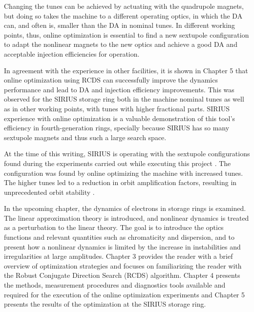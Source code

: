 Changing the tunes can be achieved by actuating with the quadrupole magnets, but doing so takes the machine to a different operating optics, in which the DA can, and often is, smaller than the DA in nominal tunes. In different working points, thus, online optimization is essential to find a new sextupole configuration to adapt the nonlinear magnets to the new optics and achieve a good DA and acceptable injection efficiencies for operation.

In agreement with the experience in other facilities, it is shown in Chapter 5 that online optimization using RCDS can successfully improve the dynamics performance and lead to DA and injection efficiency improvements. This was observed for the SIRIUS storage ring both in the machine nominal tunes as well as in other working points, with tunes with higher fractional parts.  SIRIUS experience with online optimization is a valuable demonstration of this tool's efficiency in fourth-generation rings, specially because SIRIUS has so many sextupole magnets and thus such a large search space.

At the time of this writing, SIRIUS is operating with the sextupole configurations found during the experiments carried out while executing this project \cite{velloso_online_2023}. The configuration was found by online optimizing the machine with increased tunes. The higher tunes led to a reduction in orbit amplification factors, resulting in unprecedented orbit stability \cite{liu_status_2023}.

In the upcoming chapter, the dynamics of electrons in storage rings is examined. The linear approximation theory is introduced, and nonlinear dynamics is treated as a perturbation to the linear theory. The goal is to introduce the optics functions and relevant quantities such as chromaticity and dispersion, and to present how a nonlinear dynamics is limited by the increase in instabilities and irregularities at large amplitudes. Chapter 3 provides the reader with a brief overview of optimization strategies and focuses on familiarizing the reader with the Robust Conjugate Direction Search (RCDS) algorithm. Chapter 4 presents the methods, measurement procedures and diagnostics tools available and required for the execution of the online optimization experiments and Chapter 5 presents the results of the optimization at the SIRIUS storage ring.

